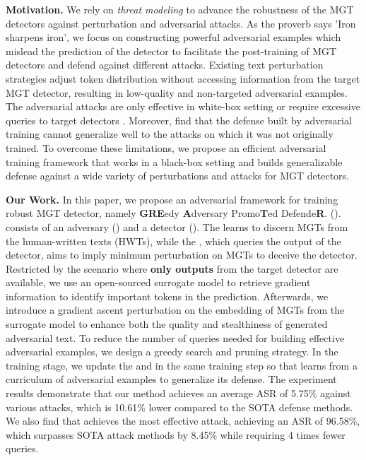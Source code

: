 \noindent\textbf{Motivation.} 
We rely on \textit{threat modeling} to
advance the robustness of the MGT detectors against perturbation and adversarial attacks.
As the proverb
says 'Iron sharpens iron', we focus on constructing powerful adversarial examples which mislead the prediction of the detector to facilitate the post-training of MGT detectors and defend against different attacks. 
Existing text perturbation strategies \cite{wang2024stumbling} adjust token distribution without accessing
information from the target MGT detector, resulting in low-quality and non-targeted adversarial
examples. 
The adversarial attacks
are only effective in white-box setting \cite{yoo2021towards} or require
excessive queries to target detectors \cite{hu2024fasttextdodger,yu2024query,liu2024hqa}.
Moreover, \citet{wang2024comprehensive} find that the defense built by adversarial training cannot generalize well to the attacks on which it was not originally trained.
To overcome these limitations, we propose an efficient adversarial training framework that works in a black-box setting and builds generalizable defense against a wide variety of perturbations and attacks for MGT detectors.



\noindent \textbf{Our Work.} 
In this paper, we propose an adversarial framework for training robust MGT detector, namely \textbf{GRE}edy \textbf{A}dversary
Promo\textbf{T}ed
Defende\textbf{R}.
(\modelname). 
\modelname consists of an adversary (\attackname) and a detector ().
The  learns to discern MGTs from the human-written texts (HWTs), while the \attackname, which queries the output of the detector, aims to imply minimum perturbation on MGTs to deceive the detector.
Restricted by the scenario where \textbf{only outputs} from the target detector are available, we use an open-sourced surrogate model to retrieve gradient information to identify important tokens in the prediction. 
Afterwards, we introduce a gradient ascent perturbation on the embedding of MGTs from the surrogate model to enhance both the quality and stealthiness of generated adversarial text. 
To reduce the number of queries needed for building effective adversarial examples, we design a greedy search and pruning strategy. 
In the training stage, we update the \attackname and  in the same training step so that  learns from a curriculum of adversarial examples to generalize its defense.
The experiment results demonstrate that our method achieves an average ASR of 5.75\% against various attacks, which is 10.61\% lower compared to the SOTA defense methods.
We also find that \attackname achieves the most effective attack, achieving an ASR of 96.58\%, which surpasses SOTA attack methods by 8.45\% while requiring 4 times fewer queries.

